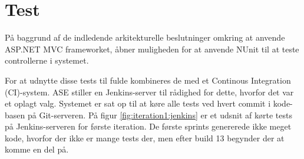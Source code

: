\section{Test}

På baggrund af de indledende arkitekturelle beslutninger omkring at anvende ASP.NET MVC frameworket, åbner muligheden for at anvende NUnit \citep{nunitWeb} til at teste controllerne i systemet.

For at udnytte disse tests til fulde kombineres de med et Continous Integration (CI)-system. ASE stiller en Jenkins-server \citep{jenkinsWeb} til rådighed for dette, hvorfor det var et oplagt valg. 
Systemet er sat op til at køre alle tests ved hvert commit i kode-basen på Git-serveren. På figur \ref{fig:iteration1:jenkins} er et udsnit af kørte tests på Jenkins-serveren for første iteration. De første sprints genererede ikke meget kode, hvorfor der ikke er mange tests der, men efter build 13 begynder der at komme en del på.



